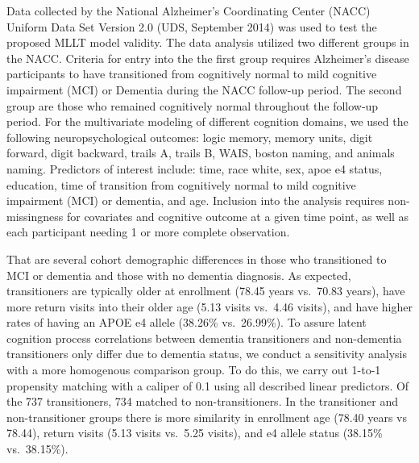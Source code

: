 \documentclass[
]{article}
\begin{document}
Data collected by the National Alzheimer's Coordinating Center (NACC) Uniform Data Set Version 2.0 (UDS, September 2014) was used to test the proposed MLLT model validity. The data analysis utilized two different groups in the NACC. Criteria for entry into the the first group requires Alzheimer's disease participants to have transitioned from cognitively normal to mild cognitive impairment (MCI) or Dementia during the NACC follow-up period. The second group are those who remained cognitively normal throughout the follow-up period. For the multivariate modeling of different cognition domains, we used the following neuropsychological outcomes: logic memory, memory units, digit forward, digit backward, trails A, trails B, WAIS, boston naming, and animals naming. Predictors of interest include: time, race white, sex, apoe e4 status, education, time of transition from cognitively normal to mild cognitive impairment (MCI) or dementia, and age. Inclusion into the analysis requires non-missingness for covariates and cognitive outcome at a given time point, as well as each participant needing 1 or more complete observation.

That are several cohort demographic differences in those who transitioned to MCI or dementia and those with no dementia diagnosis. As expected, transitioners are typically older at enrollment (78.45 years vs.~70.83 years), have more return visits into their older age (5.13 visits vs.~4.46 visits), and have higher rates of having an APOE e4 allele (38.26\% vs.~26.99\%). To assure latent cognition process correlations between dementia transitioners and non-dementia transitioners only differ due to dementia status, we conduct a sensitivity analysis with a more homogenous comparison group. To do this, we carry out 1-to-1 propensity matching with a caliper of 0.1 using all described linear predictors. Of the 737 transitioners, 734 matched to non-transitioners. In the transitioner and non-transitioner groups there is more similarity in enrollment age (78.40 years vs 78.44), return visits (5.13 visits vs.~5.25 visits), and e4 allele status (38.15\% vs.~38.15\%).
\end{document}
